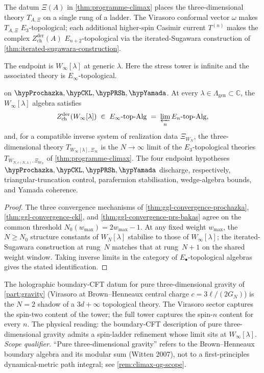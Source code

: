 The datum \(\Xi(A)\) in \cref{thm:programme-climax} places the
three-dimensional theory \(T_{A,\Xi}\) on a single rung of a ladder.
The Virasoro conformal vector $\omega$ makes \(T_{A,\Xi}\)
$E_{3}$-topological; each additional higher-spin Casimir current
$T^{(n)}$ makes the complex $Z^{\mathrm{der}}_{\mathrm{ch}}(A)$
$E_{n+2}$-topological via the iterated-Sugawara construction
of \cref{thm:iterated-sugawara-construction}.

The endpoint is $W_{\infty}[\lambda]$ at generic $\lambda$. Here the
stress tower is infinite and the associated theory is
$E_{\infty}$-topological.

\begin{theorem}
\ClaimStatusConditional{} on
$\hypProchazka, \hypCKL, \hypPRSh, \hypYamada$.
At every $\lambda \in \Lambda_{\mathrm{gen}} \subset \mathbb{C}$, the
$W_{\infty}[\lambda]$ algebra satisfies
\[
 Z^{\mathrm{der}}_{\mathrm{ch}}(W_{\infty}[\lambda])
 \;\in\; E_{\infty}\text{-}\mathrm{top}\text{-}\mathrm{Alg}
 \;=\; \varprojlim_{n} E_{n}\text{-}\mathrm{top}\text{-}\mathrm{Alg},
\]
and, for a compatible inverse system of realization data
\(\Xi_{W_N}\), the three-dimensional theory
\(T_{W_{\infty}[\lambda],\Xi_\infty}\) is the \(N \to \infty\)
limit of the \(E_{3}\)-topological theories
\(T_{W_{N,c(N,\lambda)},\Xi_{W_N}}\) of
\cref{thm:programme-climax}. The four endpoint hypotheses
$\hypProchazka, \hypCKL, \hypPRSh, \hypYamada$ discharge,
respectively, triangular-truncation control, parafermion
stabilisation, wedge-algebra bounds, and Yamada coherence.
\end{theorem}

\begin{proof}
The three convergence mechanisms of
\cref{thm:ggl-convergence-prochazka},
\cref{thm:ggl-convergence-ckl}, and
\cref{thm:ggl-convergence-prs-bakas} agree on the common threshold
$N_{0}(w_{\max}) = 2 w_{\max} - 1$. At any fixed weight $w_{\max}$,
the $N \ge N_{0}$ structure constants of $W_{N}[\lambda]$
stabilise to those of $W_{\infty}[\lambda]$; the iterated-Sugawara
construction at rung~$N$ matches that at rung~$N+1$ on the shared
weight window. Taking inverse limits in the category of
$E_{\bullet}$-topological algebras gives the stated identification.
\end{proof}

\begin{remark}
The holographic boundary-CFT datum for pure three-dimensional
gravity of \ref{part:gravity} (Virasoro
at Brown--Henneaux central charge $c = 3\ell/(2G_{N})$) is the
$N = 2$ shadow of a $3d + \infty$ topological theory. The
Virasoro sector captures the spin-two content of the tower; the
full tower captures the spin-$n$ content for every $n$. The
physical reading: the boundary-CFT description of pure
three-dimensional gravity admits a spin-ladder refinement whose
limit sits at $W_{\infty}[\lambda]$. \emph{Scope qualifier.}
``Pure three-dimensional gravity'' refers to the Brown--Henneaux
boundary algebra and its modular sum (Witten 2007), not to a
first-principles dynamical-metric path integral; see
\cref{rem:climax-qg-scope}.
\end{remark}

